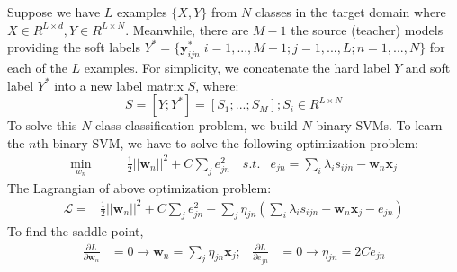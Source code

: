 Suppose we have $L$ examples $\{X,Y\}$ from $N$ classes in the target domain where $X\in R^{L\times d}, Y\in R^{L\times N}$. Meanwhile, there are $M-1$ the source (teacher) models providing the soft labels {$Y^*=\{\textbf{y}^*_{ijn}|i=1,...,M-1;j=1,...,L;n=1,...,N\}$} for each of the $L$ examples.
For simplicity, we concatenate the hard label $Y$ and soft label $Y^*$ into a new label matrix $S$, where:
\[S=[Y;Y^*]=[S_1;...;S_M]; S_i \in R^{L \times N}\]
To solve this $N$-class classification problem, we build $N$ binary SVMs.
To learn the $n$th binary SVM, we have to solve the following optimization problem: 
\begin{equation}\label{eq:multi-distill}
\begin{aligned}
\underset{w_n}{\min} \qquad & \frac{1}{2}{|| \textbf{w}_n ||^2} + C\sum_{j}{e_{jn}^2} \quad
s.t. & e_{jn} = \sum_i\lambda_is_{ijn} - \textbf{w}_n\textbf{x}_j%
\end{aligned}  
\end{equation}
The Lagrangian of above optimization problem:
\begin{equation}
\begin{aligned}
\mathcal{L}=&\frac{1}{2}{|| \textbf{w}_n ||^2} + C\sum_{j} {e_{jn}^2}+\sum_{j}\eta_{jn}\left(\sum_i\lambda_is_{ijn} - \textbf{w}_n\textbf{x}_j-e_{jn}\right)%
\end{aligned}
\end{equation}
To find the saddle point, 
\begin{equation}
\begin{aligned}
\frac{{\partial L}}{{\partial \textbf{w}_n}}& =0 \rightarrow \textbf{w}_n = \sum_{j}\eta_{jn} {\textbf{x}_j}; &
\frac{{\partial L}}{{\partial {e_{jn}}}} & =0 \rightarrow \eta_{jn} = 2C {e_{jn}}\\
\end{aligned}
\end{equation}
